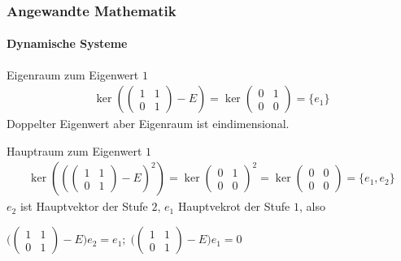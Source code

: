 \documentclass{beamer}
\begin{document}
 \begin{frame}
    \frametitle{Angewandte Mathematik}
\framesubtitle{Dynamische Systeme }
\begin{block}{Eigenraum zum Eigenwert $1$}
    \begin{align*}
    \ker (\begin{pmatrix}
        1 & 1  \\ 0 & 1
    \end{pmatrix} - E) = 
    \ker \begin{pmatrix}
        0 & 1  \\ 0 & 0  
    \end{pmatrix} = \{e_1\}
\end{align*}
Doppelter Eigenwert aber Eigenraum ist eindimensional. 
 \end{block}
 \begin{block}{Hauptraum zum Eigenwert $1$}
    \begin{align*}
    \ker ( (\begin{pmatrix}
        1 & 1  \\ 0 & 1
    \end{pmatrix} - E)^2) = 
    \ker \begin{pmatrix}
        0 & 1  \\ 0 & 0  
    \end{pmatrix}^2 = \ker \begin{pmatrix}
        0 & 0  \\ 0 & 0  
    \end{pmatrix} =  \{e_1, e_2\}
\end{align*}
$e_2$ ist Hauptvektor der Stufe $2$, $e_1$ Hauptvekrot der Stufe $1$, also

$ \biggl (\begin{pmatrix}
    1 & 1  \\ 0 & 1
\end{pmatrix} - E \biggr) e_2 = e_1; \;  \biggl (\begin{pmatrix}
    1 & 1  \\ 0 & 1
\end{pmatrix} - E \biggr) e_1 = 0$ 
 \end{block}
 \end{frame}
\end{document}
